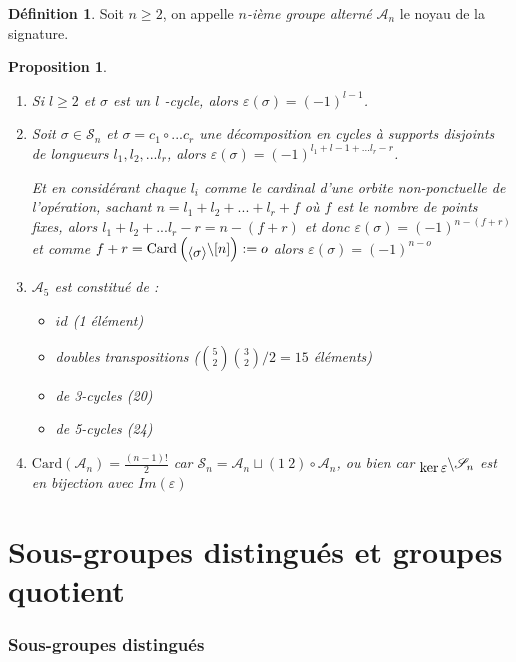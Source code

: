 \documentclass[]{article}
\newtheorem{myproposition}{Proposition}
\theoremstyle{remark}
\theoremstyle{definition}
\newtheorem{mydef}{Définition}
\newcommand*{\ClDr}[2]%
{\ensuremath{%
    \raisebox{-.65ex}{\ensuremath{#2}}\backslash #1}}
\begin{document}
\begin{mydef}
	Soit $n \geqslant 2$, on appelle \textit{$n$-ième groupe alterné} $\mathcal{A}_n$ le noyau de la signature.
\end{mydef}

\begin{myproposition}
	\leavevmode
	\begin{enumerate}
		\item Si $l \geqslant 2$ et $\sigma$ est un $l$ -cycle, alors $\varepsilon(\sigma)=(-1)^{l-1}$.
		\item Soit $\sigma \in \mathscr{S}_n$ et $\sigma = c_1 \circ ... c_r$ une décomposition en cycles à supports disjoints de longueurs $l_1, l_2, ...l_r$, alors $\varepsilon(\sigma)=(-1)^{l_1 + l-1 + ... l_r - r}$.
		
		Et en considérant chaque $l_i$ comme le cardinal d'une orbite non-ponctuelle de l'opération, sachant $n = l_1 + l_2 + ... + l_r + f$ où $f$ est le nombre de points fixes, alors $l_1 + l_2 + ... l_r - r = n - (f + r)$ et donc $\varepsilon(\sigma) = (-1)^{n - (f+r)}$ et comme $f+r = \text{Card}\left(\ClDr{[n]}{\langle \sigma \rangle}\right) := o$ alors $\varepsilon(\sigma) = (-1)^{n-o}$
		
		\item $\mathcal{A}_5$ est constitué de :
		\begin{itemize}
			\item $id$ (1 élément)
			\item doubles transpositions ($\binom{5}{2} \binom{3}{2} / 2 = 15$ éléments)
			\item de 3-cycles (20)
			\item de 5-cycles (24)
		\end{itemize}
		\item $\text{Card}(\mathcal{A}_n)  = \frac{(n-1)!}{2}$ car $\mathscr{S}_n = \mathcal{A}_n \sqcup (1 ~ 2) \circ \mathcal{A}_n$, ou bien car $\ClDr{\mathscr{S}_n}{\ker \varepsilon}$ est en bijection avec $Im(\varepsilon)$
	\end{enumerate}
\end{myproposition}

\part{Sous-groupes distingués et groupes quotient}

\section{Sous-groupes distingués}
\end{document}

